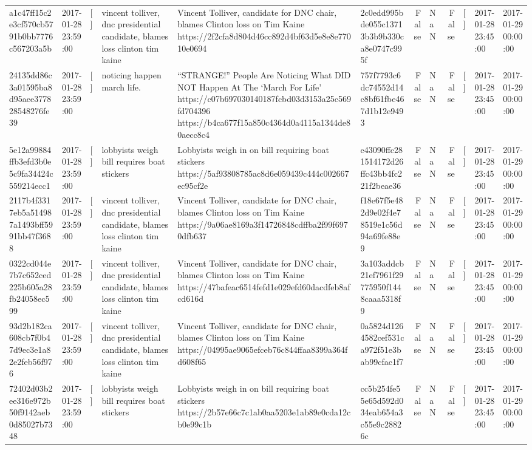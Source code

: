 \begin{tabular}{llllllrlrlll}
a1c47ff15c2e3cf570cb5791b0bb7776c567203a5b & 2017-01-28 23:59:00 & [] & vincent tolliver, dnc presidential candidate, blames loss clinton tim kaine & Vincent Tolliver, candidate for DNC chair, blames Clinton loss on Tim Kaine https://2f2cfa8d804d46cc892d4bf63d5e8e8e77010e0694 & 2c0edd995bde055c13713b3b9b330ca8e0747c995f & False & NaN & False & [] & 2017-01-28 23:45:00 & 2017-01-29 00:00:00 \\
24135dd86c3a01595ba8d95aee377828548276fe39 & 2017-01-28 23:59:00 & [] & noticing happen march life. & “STRANGE!” People Are Noticing What DID NOT Happen At The ‘March For Life’ https://c07b697030140187fcbd03d3153a25c569fd704396 https://b4ca677f15a850c4364d0a4115a1344de80aecc8c4 & 757f7793c6dc74552d14c8bf61fbe467d1b12e9493 & False & NaN & False & [] & 2017-01-28 23:45:00 & 2017-01-29 00:00:00 \\
5e12a99884ffb3efd3b0e5c9fa34424c559214ecc1 & 2017-01-28 23:59:00 & [] & lobbyists weigh bill requires boat stickers & Lobbyists weigh in on bill requiring boat stickers https://5af93808785ac8d6e059439c444c002667ec95cf2e & e43090ffc281514172d26ffc43bb4fc221f2beae36 & False & NaN & False & [] & 2017-01-28 23:45:00 & 2017-01-29 00:00:00 \\
2117b4f3317eb5a514987a1493bff5991bb47f3688 & 2017-01-28 23:59:00 & [] & vincent tolliver, dnc presidential candidate, blames loss clinton tim kaine & Vincent Tolliver, candidate for DNC chair, blames Clinton loss on Tim Kaine https://9a06ae8169a3f14726848cdffba2f99f6970dfb637 & f18e67f5e482d9e02f4e78519e1c56d94a69fe88e9 & False & NaN & False & [] & 2017-01-28 23:45:00 & 2017-01-29 00:00:00 \\
0322cd044e7b7c652ced225b605a28fb24058ec599 & 2017-01-28 23:59:00 & [] & vincent tolliver, dnc presidential candidate, blames loss clinton tim kaine & Vincent Tolliver, candidate for DNC chair, blames Clinton loss on Tim Kaine https://47bafeac6514fefd1e029efd60dacdfeb8afcd616d & 3a103addcb21ef7961f29775950f1448caaa5318f9 & False & NaN & False & [] & 2017-01-28 23:45:00 & 2017-01-29 00:00:00 \\
93d2b182ca608cb7f0b47d9ec3e1a82e2feb56f976 & 2017-01-28 23:59:00 & [] & vincent tolliver, dnc presidential candidate, blames loss clinton tim kaine & Vincent Tolliver, candidate for DNC chair, blames Clinton loss on Tim Kaine https://04995ae9065efceb76c844ffaa8399a364fd608f65 & 0a5824d1264582cef531ca972f51e3bab99cfac1f7 & False & NaN & False & [] & 2017-01-28 23:45:00 & 2017-01-29 00:00:00 \\
72402d03b2ee316e972b50f9142aeb0d85027b7348 & 2017-01-28 23:59:00 & [] & lobbyists weigh bill requires boat stickers & Lobbyists weigh in on bill requiring boat stickers https://2b57e66c7c1ab0aa5203e1ab89e0cda12cb0e99c1b & cc5b254fe55e65d592d034eab654a3c55e9c28826c & False & NaN & False & [] & 2017-01-28 23:45:00 & 2017-01-29 00:00:00 \\

\end{tabular}
